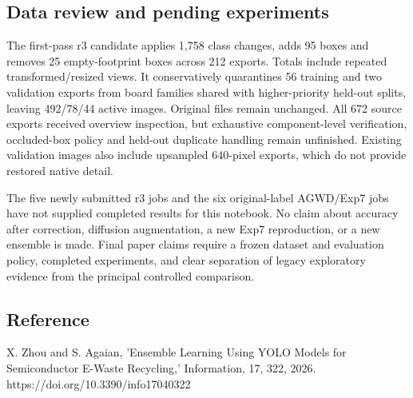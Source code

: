 \subsection{Data review and pending experiments}

The first-pass r3 candidate applies 1,758 class changes, adds 95 boxes and
removes 25 empty-footprint boxes across 212 exports. Totals include repeated
transformed/resized views. It conservatively quarantines 56 training and two
validation exports from board families shared with higher-priority held-out
splits, leaving 492/78/44 active images. Original files remain unchanged.
All 672 source exports received overview inspection, but exhaustive
component-level verification, occluded-box policy and held-out duplicate
handling remain unfinished. Existing validation images also include upsampled
640-pixel exports, which do not provide restored native detail.

The five newly submitted r3 jobs and the six original-label AGWD/Exp7 jobs
have not supplied completed results for this notebook. No claim about accuracy
after correction, diffusion augmentation, a new Exp7 reproduction, or a new
ensemble is made. Final paper claims require a frozen dataset and evaluation
policy, completed experiments, and clear separation of legacy exploratory
evidence from the principal controlled comparison.

\subsection{Reference}

X. Zhou and S. Agaian, 'Ensemble Learning Using YOLO Models for Semiconductor
E-Waste Recycling,' Information, 17, 322, 2026.
https://doi.org/10.3390/info17040322

